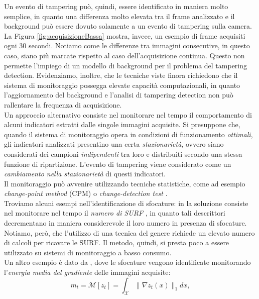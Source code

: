 Un evento di tampering pu\`o, quindi, essere identificato in maniera molto semplice, in quanto una differenza molto elevata tra il frame analizzato e il background pu\`o essere dovuto solamente a un evento di tampering sulla camera.
La Figura \ref{fig:acquisizioneBassa} mostra, invece, un esempio di frame acquisiti ogni 30 secondi.
Notiamo come le differenze tra immagini consecutive, in questo caso, siano pi\`u marcate rispetto al caso dell'acquisizione continua. 
Questo non permette l'impiego di un modello di background per il problema del tampering detection.
Evidenziamo, inoltre, che le tecniche viste finora richiedono che il sistema di monitoraggio possegga elevate capacit\`a computazionali, in quanto l'aggiornamento del background e l'analisi di tampering detection non pu\`o rallentare la frequenza di acquisizione.\\
Un approccio alternativo consiste nel monitorare nel tempo il comportamento di alcuni indicatori estratti dalle singole immagini acquisite.
Si presuppone che, quando il sistema di monitoraggio opera in condizioni di funzionamento \textit{ottimali}, gli indicatori analizzati presentino una certa \textit{stazionariet\`a}, ovvero siano considerati dei campioni \textit{indipendenti} tra loro e distribuiti secondo una stessa funzione di ripartizione.
L'evento di tampering viene considerato come un \textit{cambiamento nella stazionariet\`a} di questi indicatori.\\
Il monitoraggio pu\`o avvenire utilizzando tecniche statistiche, come ad esempio \textit{change-point method} (CPM) \cite{ross2011nonparametric} o \textit{change-detection test} \cite{pimentel2014review}.\\
Troviamo alcuni esempi nell'identificazione di sfocature: in \cite{tsesmelis2013tamper} la soluzione consiste nel monitorare nel tempo il \textit{numero di SURF} \cite{bay2006surf}, in quanto tali descrittori decrementano in maniera considerevole il loro numero in presenza di sfocature.
Notiamo, per\`o, che l'utilizzo di una tecnica del genere richiede un elevato numero di calcoli per ricavare le SURF.
Il metodo, quindi, si presta poco a essere utilizzato su sistemi di monitoraggio a basso consumo.\\
Un altro esempio \`e dato da \cite{alippi2010detecting}, dove le sfocature vengono identificate monitorando l'\textit{energia media del gradiente} delle immagini acquisite:
\[m_t = \mathcal{M}[z_t] = \int_{\mathcal{X}}\| \nabla z_t(x) \| _1 dx,\]
